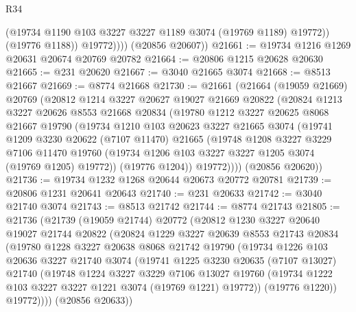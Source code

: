 \begin{lexlean}{R34}
\begin{coremodule}
                  (@19734 @1190 @103 @3227 @3227 @1189 @3074 (@19769 @1189) @19772))
                (@19776 @1188))
              @19772))))
      (@20856 @20607))
@21661 := @19734 @1216 @1269 @20631 @20674 @20769 @20782
@21664 := @20806 @1215 @20628 @20630
@21665 := @231 @20620
@21667 := @3040 @21665 @3074
@21668 := @8513 @21667
@21669 := @8774 @21668
@21730 := @21661
    (@21664
      (@19059 @21669)
      @20769
      (@20812
        @1214
        @3227
        @20627
        @19027
        @21669
        @20822
        (@20824
          @1213
          @3227
          @20626
          @8553
          @21668
          @20834
          (@19780
            @1212
            @3227
            @20625
            @8068
            @21667
            @19790
            (@19734
              @1210
              @103
              @20623
              @3227
              @21665
              @3074
              (@19741
                @1209
                @3230
                @20622
                (@7107 @11470)
                @21665
                (@19748
                  @1208
                  @3227
                  @3229
                  @7106
                  @11470
                  @19760
                  (@19734 @1206 @103 @3227 @3227 @1205 @3074 (@19769 @1205) @19772))
                (@19776 @1204))
              @19772))))
      (@20856 @20620))
@21736 := @19734 @1232 @1268 @20644 @20673 @20772 @20781
@21739 := @20806 @1231 @20641 @20643
@21740 := @231 @20633
@21742 := @3040 @21740 @3074
@21743 := @8513 @21742
@21744 := @8774 @21743
@21805 := @21736
    (@21739
      (@19059 @21744)
      @20772
      (@20812
        @1230
        @3227
        @20640
        @19027
        @21744
        @20822
        (@20824
          @1229
          @3227
          @20639
          @8553
          @21743
          @20834
          (@19780
            @1228
            @3227
            @20638
            @8068
            @21742
            @19790
            (@19734
              @1226
              @103
              @20636
              @3227
              @21740
              @3074
              (@19741
                @1225
                @3230
                @20635
                (@7107 @13027)
                @21740
                (@19748
                  @1224
                  @3227
                  @3229
                  @7106
                  @13027
                  @19760
                  (@19734 @1222 @103 @3227 @3227 @1221 @3074 (@19769 @1221) @19772))
                (@19776 @1220))
              @19772))))
      (@20856 @20633))

\end{coremodule}
\end{lexlean}

